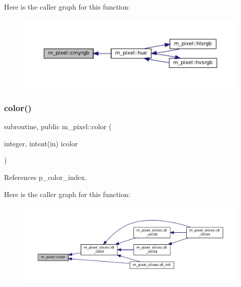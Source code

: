 Here is the caller graph for this function\+:
\nopagebreak
\begin{figure}[H]
\begin{center}
\leavevmode
\includegraphics[width=350pt]{namespacem__pixel_a98c49513d301803bb2c5cd28b8ccdba3_icgraph}
\end{center}
\end{figure}
\mbox{\label{namespacem__pixel_a334bde41bc7b2db19b950b1271ba7463}} 
\subsubsection{\texorpdfstring{color()}{color()}}
{\footnotesize\ttfamily subroutine, public m\+\_\+pixel\+::color (\begin{DoxyParamCaption}\item[{integer, intent(in)}]{icolor }\end{DoxyParamCaption})}



References p\+\_\+color\+\_\+index.

Here is the caller graph for this function\+:
\nopagebreak
\begin{figure}[H]
\begin{center}
\leavevmode
\includegraphics[width=350pt]{namespacem__pixel_a334bde41bc7b2db19b950b1271ba7463_icgraph}
\end{center}
\end{figure}
\mbox{\label{namespacem__pixel_aee26ac45961d4093d2e472fcb6e1887d}} 
